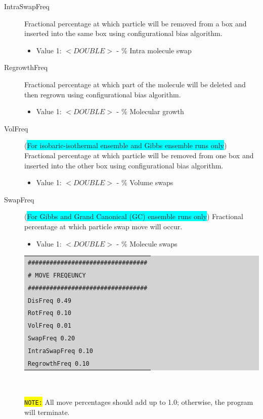 \begin{description}
\begin{itemize}
	\end{itemize}
\item [IntraSwapFreq] Fractional percentage at which particle will be removed from a box and inserted into the same box using configurational bias algorithm.
	\begin{itemize}
	\item Value 1: $<DOUBLE>$ - \% Intra molecule swap
	\end{itemize}
\item [RegrowthFreq] Fractional percentage at which part of the molecule will be deleted and then regrown using configurational bias algorithm.
	\begin{itemize}
	\item Value 1: $<DOUBLE>$ - \% Molecular growth
	\end{itemize}
\item [VolFreq] (\colorbox{cyan}{For isobaric-isothermal ensemble and Gibbs ensemble runs only}) Fractional percentage at which particle will be removed from one box and inserted into the other box using configurational bias algorithm.
	\begin{itemize}
	\item Value 1: $<DOUBLE>$ - \% Volume swaps
	\end{itemize}
\item [SwapFreq] (\colorbox{cyan}{For Gibbs and Grand Canonical (GC) ensemble runs only}) Fractional percentage at which particle swap move will occur.
	\begin{itemize}
	\item Value 1: $<DOUBLE>$ - \% Molecule swaps
	\end{itemize}
	\colorbox{lightgray}{
	\begin{tabular}{l}
	\texttt{\#\#\#\#\#\#\#\#\#\#\#\#\#\#\#\#\#\#\#\#\#\#\#\#\#\#\#\#\#\#\#\#\#}\\
	\texttt{\#  MOVE FREQEUNCY}\\
	\texttt{\#\#\#\#\#\#\#\#\#\#\#\#\#\#\#\#\#\#\#\#\#\#\#\#\#\#\#\#\#\#\#\#\#}\\
	\texttt{DisFreq   0.49}\\
	\texttt{RotFreq   0.10}\\
	\texttt{VolFreq   0.01}\\
	\texttt{SwapFreq   0.20}\\
	\texttt{IntraSwapFreq   0.10}\\
	\texttt{RegrowthFreq   0.10}\\
	\end{tabular}}\\\\
	\colorbox{yellow}{\texttt{NOTE:}} All move percentages should add up to 1.0; otherwise, the program will terminate.
	

\end{description}
